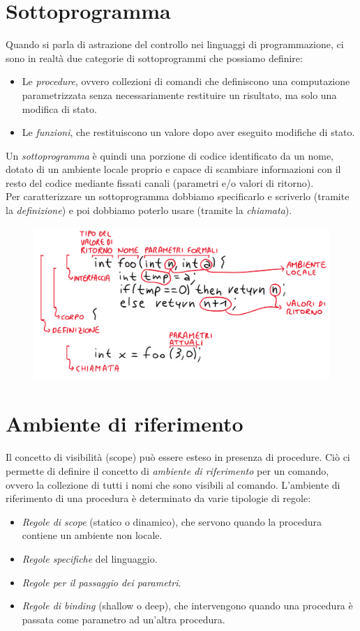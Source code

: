 \documentclass[a4paper,oneside,titlepage]{book}
\begin{document}
\section{Sottoprogramma}
Quando si parla di astrazione del controllo nei linguaggi di programmazione, ci sono in realtà due categorie di sottoprogrammi che possiamo definire:
\begin{itemize}
	\item Le \textit{procedure}, ovvero collezioni di comandi che definiscono una computazione parametrizzata senza necessariamente restituire un risultato, ma solo una modifica di stato.
	\item Le \textit{funzioni}, che restituiscono un valore dopo aver eseguito modifiche di stato.
\end{itemize}
Un \textit{sottoprogramma} è quindi una porzione di codice identificato da un nome, dotato di un ambiente locale proprio e capace di scambiare informazioni con il resto del codice mediante fissati canali (parametri e/o valori di ritorno).
\\
Per caratterizzare un sottoprogramma dobbiamo specificarlo e scriverlo (tramite la \textit{definizione}) e poi dobbiamo poterlo usare (tramite la \textit{chiamata}).
\begin{figure}[htp]
	\centering
	\includegraphics[width=\textwidth, height=\textheight, keepaspectratio]{sottoprogramma.png}
\end{figure}

\section{Ambiente di riferimento}
Il concetto di visibilità (scope) può essere esteso in presenza di procedure. Ciò ci permette di definire il concetto di \textit{ambiente di riferimento} per un comando, ovvero la collezione di tutti i nomi che sono visibili al comando. L'ambiente di riferimento di una procedura è determinato da varie tipologie di regole:
\begin{itemize}
	\item \textit{Regole di scope} (statico o dinamico), che servono quando la procedura contiene un ambiente non locale.
	\item \textit{Regole specifiche} del linguaggio.
	\item \textit{Regole per il passaggio dei parametri}.
	\item \textit{Regole di binding} (shallow o deep), che intervengono quando una procedura è passata come parametro ad un'altra procedura.
\end{itemize}
\end{document}

